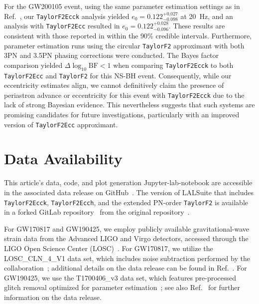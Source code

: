 \documentclass[aps,prd,twocolumn,superscriptaddress,groupedaddress,nofootinbib,showpacs,eqsecnum,useAms]{revtex4-2}
\begin{document}
For the GW200105 event, using the same parameter estimation settings as in Ref.~\cite{Morras2025b}, our \texttt{TaylorF2Ecck} analysis yielded $e_0 = 0.122^{+0.027}_{-0.098}$ at 20~Hz, and an analysis with \texttt{TaylorF2Ecc} resulted in $e_0 = 0.122^{+0.028}_{-0.096}$. These results are consistent with those reported in\cite{Morras2025b} within the 90\% credible intervals. Furthermore, parameter estimation runs using the circular \texttt{TaylorF2} approximant with both 3PN and 3.5PN phasing corrections were conducted. The Bayes factor comparison yielded $\Delta \log_{10} \mathrm{BF} < 1$ when comparing \texttt{TaylorF2Ecck} to both \texttt{TaylorF2Ecc} and \texttt{TaylorF2} for this NS-BH event. Consequently, while our eccentricity estimates align, we cannot definitively claim the presence of periastron advance or eccentricity for this event with \texttt{TaylorF2Ecck} due to the lack of strong Bayesian evidence. This nevertheless suggests that such systems are promising candidates for future investigations, particularly with an improved version of \texttt{TaylorF2Ecc} approximant.

\section{Data Availability}\label{DataAvailability}

This article's data, code, and plot generation Jupyter-lab-notebook are accessible in the associated data release on GitHub~\cite{TaylorF2EcckRepo}. The version of LALSuite that includes \texttt{TaylorF2Ecck}, \texttt{TaylorF2Ecch}, and the extended PN-order \texttt{TaylorF2} is available in a forked GitLab repository~\cite{lalsuitehemanta2022} from the original repository~\cite{lalsuite}.

For GW170817 and GW190425, we employ publicly available gravitational-wave strain data from the Advanced LIGO and Virgo detectors, accessed through the LIGO Open Science Center (LOSC)~\cite{Vallisneri_2015}. For GW170817, we utilize the LOSC\_CLN\_4\_V1 data set, which includes noise subtraction performed by the collaboration~\cite{Blackburn2017_LOSC_CLN, Driggers2019}; additional details on the data release can be found in Ref.~\cite{GWOSC2017_GW170817}. For GW190425, we use the T1700406\_v3 data set, which features pre-processed glitch removal optimized for parameter estimation~\cite{Abbott2020b_GW190425Glitch, Abbott2020GW190425}; see also Ref.~\cite{LIGO2019_GW190425_data} for further information on the data release.
\end{document}
